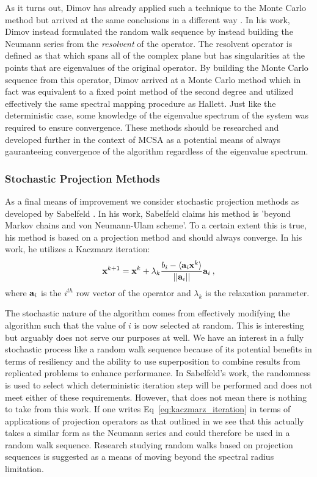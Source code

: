 As it turns out, Dimov has already applied such a technique to the
Monte Carlo method but arrived at the same conclusions in a different
way \cite{dimov_parallel_2001,dimov_new_1998}. In his work, Dimov
instead formulated the random walk sequence by instead building the
Neumann series from the \textit{resolvent} of the operator. The
resolvent operator is defined as that which spans all of the complex
plane but has singularities at the points that are eigenvalues of the
original operator. By building the Monte Carlo sequence from this
operator, Dimov arrived at a Monte Carlo method which in fact was
equivalent to a fixed point method of the second degree and utilized
effectively the same spectral mapping procedure as Hallett. Just like
the deterministic case, some knowledge of the eigenvalue spectrum of
the system was required to ensure convergence. These methods should be
researched and developed further in the context of MCSA as a potential
means of always gauranteeing convergence of the algorithm regardless
of the eigenvalue spectrum.

\subsubsection{Stochastic Projection Methods}
\label{subsubsec:stochastic_projection_methods}

As a final means of improvement we consider stochastic projection
methods as developed by Sabelfeld \cite{hutchison_stochastic_2011}. In
his work, Sabelfeld claims his method is 'beyond Markov chains and von
Neumann-Ulam scheme'. To a certain extent this is true, his method is
based on a projection method and should always converge. In his work,
he utilizes a Kaczmarz iteration:
\begin{equation}
  \mathbf{x}^{k+1} = \mathbf{x}^k + \lambda_k \frac{b_i - \langle \mathbf{a}_i
    \mathbf{x}^k \rangle}{||\mathbf{a}_i||}\mathbf{a}_i\:,
  \label{eq:kaczmarz_iteration}
\end{equation}
where $\mathbf{a}_i$ is the $i^{th}$ row vector of the operator and
$\lambda_k$ is the relaxation parameter.

The stochastic nature of the algorithm comes from effectively
modifying the algorithm such that the value of $i$ is now selected at
random. This is interesting but arguably does not serve our purposes
at well. We have an interest in a fully stochastic process like a
random walk sequence because of its potential benefits in terms of
resiliency and the ability to use superposition to combine results
from replicated problems to enhance performance. In Sabelfeld's work,
the randomness is used to select which deterministic iteration step
will be performed and does not meet either of these
requirements. However, that does not mean there is nothing to take
from this work. If one writes Eq~\ref{eq:kaczmarz_iteration} in terms
of applications of projection operators as that outlined in
\cite{tanabe_projection_1971} we see that this actually takes a
similar form as the Neumann series and could therefore be used in a
random walk sequence. Research studying random walks based on
projection sequences is suggested as a means of moving beyond the
spectral radius limitation.

